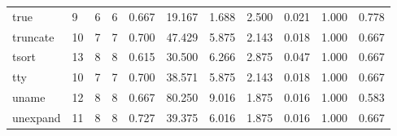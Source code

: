 \begin{longtable}{lp{1.8cm}p{1.8cm}p{1.8cm}p{1.8cm}p{1.8cm}p{1.8cm}p{1.8cm}p{1.8cm}p{1.8cm}p{1.8cm}}
true      &                            9 &                  6 &                                 6 &                                      0.667 &                                 19.167 &                                        1.688 &                             2.500 &                                   0.021 &                              1.000 &                                              0.778 \\
truncate  &                           10 &                  7 &                                 7 &                                      0.700 &                                 47.429 &                                        5.875 &                             2.143 &                                   0.018 &                              1.000 &                                              0.667 \\
tsort     &                           13 &                  8 &                                 8 &                                      0.615 &                                 30.500 &                                        6.266 &                             2.875 &                                   0.047 &                              1.000 &                                              0.667 \\
tty       &                           10 &                  7 &                                 7 &                                      0.700 &                                 38.571 &                                        5.875 &                             2.143 &                                   0.018 &                              1.000 &                                              0.667 \\
uname     &                           12 &                  8 &                                 8 &                                      0.667 &                                 80.250 &                                        9.016 &                             1.875 &                                   0.016 &                              1.000 &                                              0.583 \\
unexpand  &                           11 &                  8 &                                 8 &                                      0.727 &                                 39.375 &                                        6.016 &                             1.875 &                                   0.016 &                              1.000 &                                              0.667 \\

\end{longtable}
